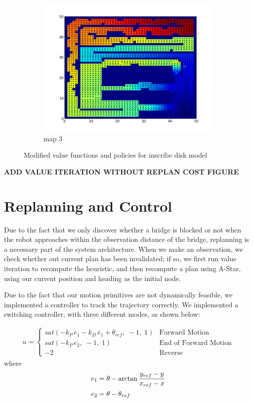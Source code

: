\documentclass{article}
\begin{document}
\begin{figure}[h]
\begin{subfigure}[b]{0.45\textwidth}
        \includegraphics[width = \textwidth]{map3value_uncertain.png}
        \caption{map 3}
        \label{fig:map3value_mod}
    \end{subfigure}
    \caption{Modified value functions and policies for inscribe disk model}
    \label{fig:valuefcns_mod}
\end{figure}

\textbf{ADD VALUE ITERATION WITHOUT REPLAN COST FIGURE}

\section{Replanning and Control}

Due to the fact that we only discover whether a bridge is blocked or not when the robot approaches within the observation distance of the bridge, replanning is a necessary part of the system architecture. When we make an observation, we check whether out current plan has been invalidated; if so, we first run value iteration to recompute the heuristic, and then recompute a plan using A-Star, using our current position and heading as the initial node.

Due to the fact that our motion primitives are not dynamically feasible, we implemented a controller to track the trajectory correctly. We implemented a switching controller, with three different modes, as shown below:

\begin{align*}
u =
\begin{cases}
sat(-k_P\,e_1 - k_D\,\dot{e_1} + \theta_{ref},\; -1,\; 1) & \text{Forward Motion}\\
sat(-k_P\,e_2,\; -1,\; 1) & \text{End of Forward Motion}\\
-2 & \text{Reverse}
\end{cases}
\end{align*}
where 
\begin{align*}
\centering
e_1 &= \theta - \arctan{\frac{y_{ref} - y}{x_{ref} - x}}\\
e_2 &= \theta - \theta_{ref}
\end{align*}
\end{document}
